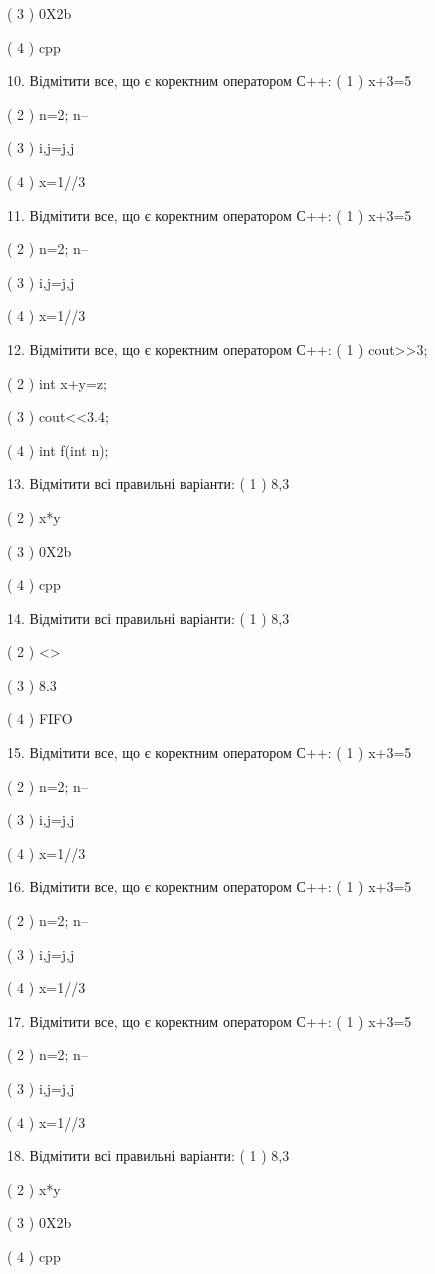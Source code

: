 \documentclass[11pt]{article}
\begin{document}
( 3 ) 0X2b

( 4 ) cpp

10. Відмітити все, що є коректним оператором С++:
( 1 ) x+3=5

( 2 ) n=2; n--

( 3 ) i,j=j,j

( 4 ) x=1//3

11. Відмітити все, що є коректним оператором С++:
( 1 ) x+3=5

( 2 ) n=2; n--

( 3 ) i,j=j,j

( 4 ) x=1//3

12. Відмітити все, що є коректним оператором С++:
( 1 ) cout>>3;

( 2 ) int x+y=z;

( 3 ) cout<<3.4;

( 4 ) int f(int n);

13. Відмітити всі правильні варіанти:
( 1 ) 8,3

( 2 ) x*y

( 3 ) 0X2b

( 4 ) cpp

14. Відмітити всі правильні варіанти:
( 1 ) 8,3

( 2 ) <>

( 3 ) 8.3

( 4 ) FIFO

15. Відмітити все, що є коректним оператором С++:
( 1 ) x+3=5

( 2 ) n=2; n--

( 3 ) i,j=j,j

( 4 ) x=1//3

16. Відмітити все, що є коректним оператором С++:
( 1 ) x+3=5

( 2 ) n=2; n--

( 3 ) i,j=j,j

( 4 ) x=1//3

17. Відмітити все, що є коректним оператором С++:
( 1 ) x+3=5

( 2 ) n=2; n--

( 3 ) i,j=j,j

( 4 ) x=1//3

18. Відмітити всі правильні варіанти:
( 1 ) 8,3

( 2 ) x*y

( 3 ) 0X2b

( 4 ) cpp
\end{document}
